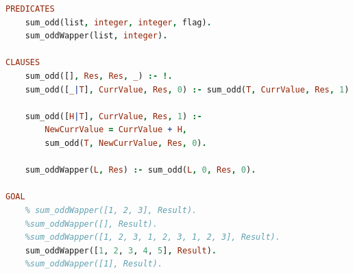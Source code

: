 \documentclass[a4paper,oneside,12pt]{extreport}
\begin{document}
\begin{task}
\begin{lstlisting}[language=Prolog]
PREDICATES
    sum_odd(list, integer, integer, flag).
    sum_oddWapper(list, integer).
    
CLAUSES
    sum_odd([], Res, Res, _) :- !.
    sum_odd([_|T], CurrValue, Res, 0) :- sum_odd(T, CurrValue, Res, 1).
    
    sum_odd([H|T], CurrValue, Res, 1) :- 
        NewCurrValue = CurrValue + H,
        sum_odd(T, NewCurrValue, Res, 0).
    
    sum_oddWapper(L, Res) :- sum_odd(L, 0, Res, 0). 

GOAL
    % sum_oddWapper([1, 2, 3], Result).
    %sum_oddWapper([], Result).
    %sum_oddWapper([1, 2, 3, 1, 2, 3, 1, 2, 3], Result).
    sum_oddWapper([1, 2, 3, 4, 5], Result).
    %sum_oddWapper([1], Result).
    \end{lstlisting}

    \begin{figure}[ht!]
    \end{figure}
    
    \begin{figure}[ht!]
    \end{figure}

    \begin{figure}[ht!]
    \end{figure}
\end{task}

\newpage
\end{document}
